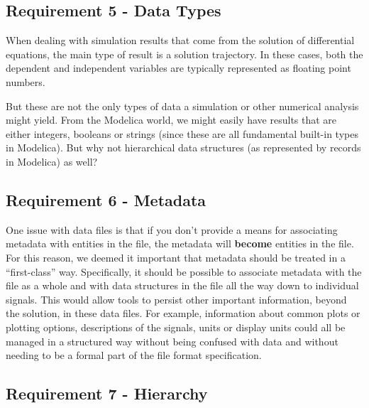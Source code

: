 \documentclass[11pt,a4paper,twocolumn]{article}
\begin{document}
\subsection{Requirement 5 - Data Types}


When dealing with simulation results that come from the solution of
differential equations, the main type of result is a solution
trajectory.  In these cases, both the dependent and independent
variables are typically represented as floating point numbers.

But these are not the only types of data a simulation or other
numerical analysis might yield.  From the Modelica world, we might
easily have results that are either integers, booleans or strings
(since these are all fundamental built-in types in Modelica).  But why
not hierarchical data structures (as represented by records in
Modelica) as well?

\subsection{Requirement 6 - Metadata}


One issue with data files is that if you don't provide a means for
associating metadata with entities in the file, the metadata will
\textbf{become} entities in the file.  For this reason, we deemed it
important that metadata should be treated in a ``first-class'' way.
Specifically, it should be possible to associate metadata with the
file as a whole and with data structures in the file all the way down
to individual signals.  This would allow tools to persist other
important information, beyond the solution, in these data files.  For
example, information about common plots or plotting options,
descriptions of the signals, units or display units could all be
managed in a structured way without being confused with data and
without needing to be a formal part of the file format specification.

\subsection{Requirement 7 - Hierarchy}

\end{document}
